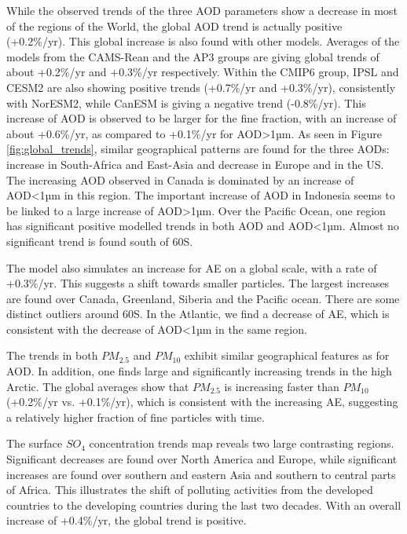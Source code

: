 \documentclass[journal abbreviation, manuscript]{copernicus}
\begin{document}
While the observed trends of the three AOD parameters show a decrease in most of the regions of the World, the global AOD trend is actually positive (+0.2\%/yr). This global increase is also found with other models. Averages of the models from the CAMS-Rean and the AP3 groups are giving global trends of about +0.2\%/yr and +0.3\%/yr respectively. Within the CMIP6 group, IPSL and CESM2 are also showing positive trends (+0.7\%/yr and +0.3\%/yr), consistently with NorESM2, while CanESM is giving a negative trend (-0.8\%/yr).
This increase of AOD is observed to be larger for the fine fraction, with an increase of about +0.6\%/yr, as compared to +0.1\%/yr for AOD>1µm. As seen in Figure \ref{fig:global_trends}, similar geographical patterns are found for the three AODs: increase in South-Africa and East-Asia and decrease in Europe and in the US. The increasing AOD observed in Canada is dominated by an increase of AOD<1µm in this region. The important increase of AOD in Indonesia seems to be linked to a large increase of AOD>1µm. Over the Pacific Ocean, one region has significant positive modelled trends in both AOD and AOD<1µm. Almost no significant trend is found south of 60\textdegree S.

The model also simulates an increase for AE on a global scale, with a rate of +0.3\%/yr. This suggests a shift towards smaller particles. The largest increases are found over Canada, Greenland, Siberia and the Pacific ocean. There are some distinct outliers around 60\textdegree S. In the Atlantic, we find a decrease of AE, which is consistent with the decrease of AOD<1µm in the same region.

The trends in both $PM_{2.5}$ and $PM_{10}$ exhibit similar geographical features as for AOD. In addition, one finds large and significantly increasing trends in the high Arctic. The global averages show that $PM_{2.5}$ is increasing faster than $PM_{10}$  (+0.2\%/yr vs. +0.1\%/yr), which is consistent with the increasing AE, suggesting a relatively higher fraction of fine particles with time.

The surface $SO_{4}$ concentration trends map reveals two large contrasting regions. Significant decreases are found over North America and Europe, while significant increases are found over southern and eastern Asia and southern to central parts of Africa. This illustrates the shift of polluting activities from the developed countries to the developing countries during the last two decades. With an overall increase of +0.4\%/yr, the global trend is positive.
\end{document}
